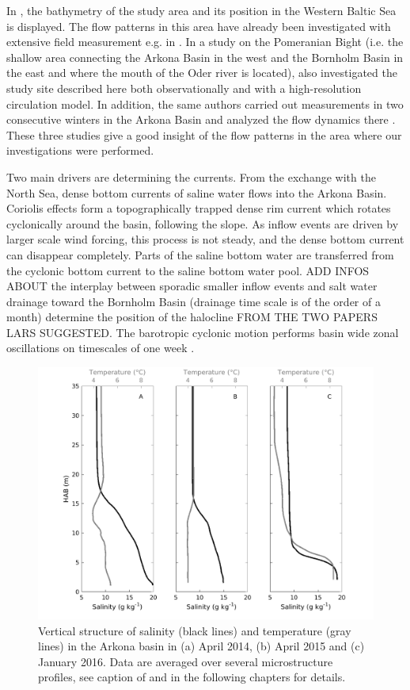 In , the bathymetry of the study area and its position in the 
Western Baltic Sea is displayed. The flow patterns in this area have already 
been investigated with extensive field measurement e.g. in \cite{lass1993}. In 
a study on the Pomeranian Bight (i.e. the shallow area connecting the Arkona 
Basin in the west and the Bornholm Basin in the east and where the mouth of the 
Oder river is located), \cite{lass2001} also investigated the study site 
described here both observationally and with a high-resolution circulation 
model. In addition, the same authors carried out measurements in two 
consecutive 
winters in the Arkona Basin and analyzed the flow dynamics there 
\citep[][]{lass2003}. These three studies give a good insight 
of the flow patterns in the area where our investigations were performed.


Two main drivers are determining the currents. From the exchange with the North 
Sea, dense bottom currents of saline water flows into the Arkona Basin. 
Coriolis effects form a topographically trapped dense rim current which rotates 
cyclonically around the basin, following the slope. As inflow events are 
driven by larger scale wind forcing, this process is not steady, and the 
dense bottom current can disappear completely. Parts of the saline bottom water 
are transferred from the cyclonic bottom current to the saline bottom water 
pool. ADD INFOS ABOUT the interplay between sporadic smaller inflow events and 
salt water drainage toward the Bornholm Basin (drainage time scale is of the 
order of a month) determine the position of the halocline FROM THE TWO PAPERS 
LARS SUGGESTED. The barotropic 
cyclonic motion performs basin wide zonal oscillations on timescales of one 
week \citep[][]{lass2003}.

  \begin{figure}[ht]
\includegraphics[width=40pc]{bilder/arkona_TS.png}
 \caption{Vertical structure of salinity (black lines) and temperature (gray 
lines) in the Arkona basin in (a) April 2014, (b) April 2015 and (c) January 
2016. Data are averaged over several microstructure profiles, see caption of 
 and  in the following chapters for details.}
 \label{abslope}
 \end{figure}

